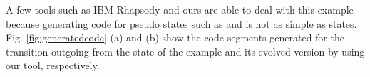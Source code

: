 A few tools such as IBM Rhapsody \cite{ibm_rhapsody} and ours are able to deal with this example because generating code for pseudo states such as  and  is not as simple as states.
Fig. \ref{fig:generatedcode} (a) and (b) show the code segments generated for the transition outgoing from the state  of the example and its evolved version by using our tool, respectively.




